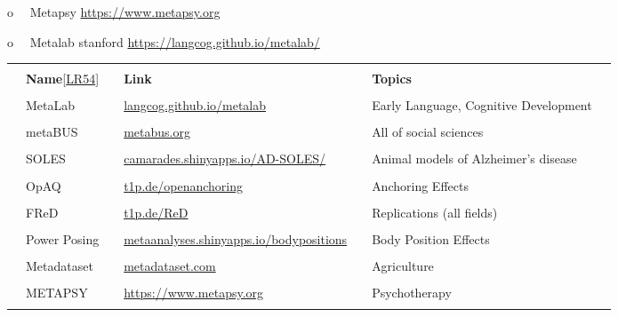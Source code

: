\documentclass[
  letterpaper,
  DIV=11,
  numbers=noendperiod]{scrreprt}
\begin{document}
o~~ Metapsy \url{https://www.metapsy.org}

o~~ Metalab stanford \url{https://langcog.github.io/metalab/}

\begin{longtable}[]{@{}
  >{\raggedright\arraybackslash}p{}
  >{\raggedright\arraybackslash}p{}
  >{\raggedright\arraybackslash}p{}
  >{\raggedright\arraybackslash}p{}
  >{\raggedright\arraybackslash}p{}
  >{\raggedright\arraybackslash}p{}
  >{\raggedright\arraybackslash}p{}@{}}
\toprule\noalign{}
\endhead
\bottomrule\noalign{}
\endlastfoot
& & & & & & \\
& \textbf{Name}\hyperref[_msocom_54]{{[}LR54{]}} & & \textbf{Link} & &
\textbf{Topics} & \\
& & & & & & \\
& MetaLab & &
\href{https://langcog.github.io/metalab}{langcog.github.io/metalab} & &
Early Language, Cognitive Development & \\
& & & & & & \\
& metaBUS & & \href{http://metabus.org/}{metabus.org} & & All of social
sciences & \\
& & & & & & \\
& SOLES & &
\href{https://camarades.shinyapps.io/AD-SOLES/}{camarades.shinyapps.io/AD-SOLES/}
& & Animal models of Alzheimer's disease & \\
& & & & & & \\
& OpAQ & & \href{https://t1p.de/openanchoring}{t1p.de/openanchoring} & &
Anchoring Effects & \\
& & & & & & \\
& FReD & & \href{https://t1p.de/ReD}{t1p.de/ReD} & & Replications (all
fields) & \\
& & & & & & \\
& Power Posing & &
\href{https://metaanalyses.shinyapps.io/bodypositions/}{metaanalyses.shinyapps.io/bodypositions}
& & Body Position Effects & \\
& & & & & & \\
& Metadataset & & \href{https://www.metadataset.com/}{metadataset.com} &
& Agriculture & \\
& & & & & & \\
& METAPSY & & \url{https://www.metapsy.org} & & Psychotherapy & \\
& & & & & & \\
\end{longtable}
\end{document}
